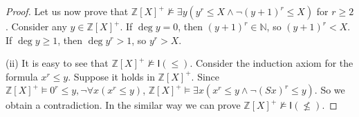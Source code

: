 \documentclass[a4paper,14pt]{article}
\theoremstyle{definition}
\theoremstyle{theorem}
\theoremstyle{lemma}
\theoremstyle{proposition}
\theoremstyle{remark}
\theoremstyle{corollary}
\theoremstyle{problem}
\theoremstyle{hypothesis}
\begin{document}
\begin{proof}
    Let us now prove that $\mathbb Z[X]^+ \nvDash \exists y (y^r \leqslant X \wedge \neg (y + 1)^r \leqslant X)$ for $r \geqslant 2$. Consider any $y \in \mathbb Z[X]^+$. If $\deg y = 0$, then $(y + 1)^r \in \mathbb N$, so $(y + 1)^r < X$. If $\deg y \geqslant 1$, then $\deg y^r > 1$, so $y^r > X$.
    
    (ii) It is easy to see that $\mathbb Z[X]^+ \nvDash \mathsf I(\leqslant)$. Consider the induction axiom for the formula $x^r \leqslant y$. Suppose it holds in $\mathbb Z[X]^+$. Since $\mathbb Z[X]^+ \vDash 0^r \leqslant y, \neg \forall x (x^r \leqslant y)$, $\mathbb Z[X]^+ \vDash \exists x (x^r \leqslant y \wedge \neg (Sx)^r \leqslant y)$. So we obtain a contradiction. In the similar way we can prove $\mathbb Z[X]^+ \nvDash \mathsf I(\nleqslant)$.
\end{proof}
\end{document}
